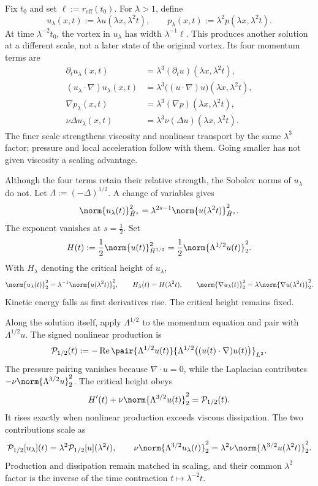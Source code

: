 
Fix \(t_0\) and set \(\ell:=r_{\mathrm{eff}}(t_0)\).
For \(\lambda>1\), define
\[
  u_\lambda(x,t)
  :=
  \lambda u(\lambda x,\lambda^2t),
  \qquad
  p_\lambda(x,t)
  :=
  \lambda^2p(\lambda x,\lambda^2t).
\]
At time \(\lambda^{-2}t_0\), the vortex in \(u_\lambda\) has width \(\lambda^{-1}\ell\).
This produces another solution at a different scale, not a later state of the original vortex.
Its four momentum terms are
\[
\begin{aligned}
  \partial_tu_\lambda(x,t)
  &=
  \lambda^3(\partial_tu)(\lambda x,\lambda^2t),
  \\
  (u_\lambda\cdot\nabla)u_\lambda(x,t)
  &=
  \lambda^3\bigl((u\cdot\nabla)u\bigr)(\lambda x,\lambda^2t),
  \\
  \nabla p_\lambda(x,t)
  &=
  \lambda^3(\nabla p)(\lambda x,\lambda^2t),
  \\
  \nu\Delta u_\lambda(x,t)
  &=
  \lambda^3\nu(\Delta u)(\lambda x,\lambda^2t).
\end{aligned}
\]
The finer scale strengthens viscosity and nonlinear transport by the same \(\lambda^3\) factor; pressure and local acceleration follow with them.
Going smaller has not given viscosity a scaling advantage.


Although the four terms retain their relative strength, the Sobolev norms of \(u_\lambda\) do not.
Let \(\Lambda:=(-\Delta)^{1/2}\).
A change of variables gives
\[
  \norm{u_\lambda(t)}_{\dot H^s}^2
  =
  \lambda^{2s-1}
  \norm{u(\lambda^2t)}_{\dot H^s}^2.
\]
The exponent vanishes at \(s=\tfrac12\).
Set
\[
  H(t)
  :=
  \frac12\norm{u(t)}_{\dot H^{1/2}}^2
  =
  \frac12\norm{\Lambda^{1/2}u(t)}_2^2.
\]
With \(H_\lambda\) denoting the critical height of \(u_\lambda\),
\[
  \norm{u_\lambda(t)}_2^2
  =
  \lambda^{-1}\norm{u(\lambda^2t)}_2^2,
  \qquad
  H_\lambda(t)=H(\lambda^2t),
  \qquad
  \norm{\nabla u_\lambda(t)}_2^2
  =
  \lambda\norm{\nabla u(\lambda^2t)}_2^2.
\]
Kinetic energy falls as first derivatives rise.
The critical height remains fixed.


Along the solution itself, apply \(\Lambda^{1/2}\) to the momentum equation and pair with \(\Lambda^{1/2}u\).
The signed nonlinear production is
\[
  \mathcal P_{1/2}(t)
  :=
  -\operatorname{Re}
  \pair
    {\Lambda^{1/2}u(t)}
    {\Lambda^{1/2}\bigl((u(t)\cdot\nabla)u(t)\bigr)}_{L^2}.
\]
The pressure pairing vanishes because \(\nabla\cdot u=0\), while the Laplacian contributes \(-\nu\norm{\Lambda^{3/2}u}_2^2\).
The critical height obeys
\[
  H'(t)
  +
  \nu\norm{\Lambda^{3/2}u(t)}_2^2
  =
  \mathcal P_{1/2}(t).
\]
It rises exactly when nonlinear production exceeds viscous dissipation.
The two contributions scale as
\[
  \mathcal P_{1/2}[u_\lambda](t)
  =
  \lambda^2\mathcal P_{1/2}[u](\lambda^2t),
  \qquad
  \nu\norm{\Lambda^{3/2}u_\lambda(t)}_2^2
  =
  \lambda^2\nu\norm{\Lambda^{3/2}u(\lambda^2t)}_2^2.
\]
Production and dissipation remain matched in scaling, and their common \(\lambda^2\) factor is the inverse of the time contraction \(t\mapsto\lambda^{-2}t\).

